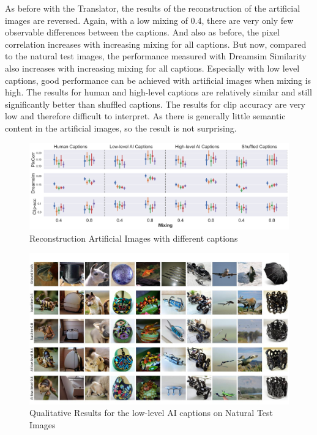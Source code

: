 As before with the Translator, the results of the reconstruction of the artificial images are reversed. Again, with a low mixing of 0.4, there are very only few observable differences between the captions. And also as before, the pixel correlation increases with increasing mixing for all captions. But now, compared to the natural test images, the performance measured with Dreamsim Similarity also increases with increasing mixing for all captions. Especially with low level captions, good performance can be achieved with artificial images when mixing is high. The results for human and high-level captions are relatively similar and still significantly better than shuffled captions. The results for clip accuracy are very low and therefore difficult to interpret. As there is generally little semantic content in the artificial images, so the result is not surprising. 

\begin{figure}[ht]
    \centering
    \includegraphics[width=1\textwidth]{plots/aicap_reconstruction_art_both_mixings.png}
    \caption{Reconstruction Artificial Images with different captions}\label{fig:aicap_reconstruction_art_both_mixings}
\end{figure}

\begin{figure}[ht]
    \centering
    \includegraphics[width=1\textwidth]{plots/aicap_qual_test.JPEG}
    \caption{Qualitative Results for the low-level AI captions on Natural Test Images}\label{fig:aicap_qual_test}
\end{figure}

